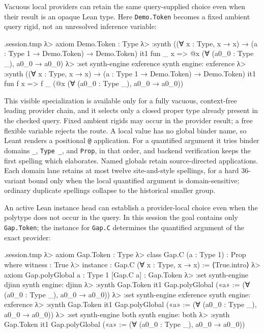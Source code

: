 \documentclass[11pt,oneside]{article}
\newcommand{\code}[1]{\texttt{#1}}
\newenvironment{session}
 {\VerbatimEnvironment\begin{VerbatimOut}{\jobname.session.tmp}}
 {\end{VerbatimOut}%
  \begin{sessionouter}%
  \VerbatimInput[fontsize=\footnotesize, breaklines=true,
    breaksymbolleft={\textcolor{stone}{\footnotesize$\hookrightarrow$}},
    formatcom=\color{ink}, tabsize=4]{\jobname.session.tmp}%
  \end{sessionouter}}
\begin{document}
Vacuous local providers can retain the same query-supplied choice even when
their result is an opaque Lean type. Here \code{Demo.Token} becomes a fixed
ambient query rigid, not an unresolved inference variable:

\begin{session}
λ> axiom Demo.Token : Type
λ> :synth ((∀ x : Type, x → x) → ({a : Type 1} → Demo.Token) → Demo.Token)
  it1  fun _ x => @x (∀ (a0_0 : Type _), a0_0 → a0_0)
λ> :set synth-engine exference
synth engine: exference
λ> :synth ((∀ x : Type, x → x) → ({a : Type 1} → Demo.Token) → Demo.Token)
  it1  fun f x => f _ (@x (∀ (a0_0 : Type _), a0_0 → a0_0))
\end{session}

This visible specialization is available only for a fully vacuous,
context-free leading provider chain, and it selects only a closed proper type
already present in the checked query. Fixed ambient rigids may occur in the
provider result; a free flexible variable rejects the route. A local value has
no global binder name, so Leant renders a positional \code{@} application. For
a quantified argument it tries binder domains \code{\_}, \code{Type \_}, and
\code{Prop}, in that order, and backend verification keeps the first spelling
which elaborates. Named globals retain source-directed applications. Each
domain lane retains at most twelve site-and-style spellings, for a hard
36-variant bound only when the local quantified argument is domain-sensitive;
ordinary duplicate spellings collapse to the historical smaller group.

An active Lean instance head can establish a provider-local choice even when
the polytype does not occur in the query. In this session the goal contains
only \code{Gap.Token}; the instance for \code{Gap.C} determines the quantified
argument of the exact provider:

\begin{session}
λ> axiom Gap.Token : Type
λ> class Gap.C (a : Type 1) : Prop where witness : True
λ> instance : Gap.C (∀ x : Type, x → x) := ⟨True.intro⟩
λ> axiom Gap.polyGlobal {a : Type 1} [Gap.C a] : Gap.Token
λ> :set synth-engine djinn
synth engine: djinn
λ> :synth Gap.Token
  it1  Gap.polyGlobal («a» := (∀ (a0_0 : Type _), a0_0 → a0_0))
λ> :set synth-engine exference
synth engine: exference
λ> :synth Gap.Token
  it1  Gap.polyGlobal («a» := (∀ (a0_0 : Type _), a0_0 → a0_0))
λ> :set synth-engine both
synth engine: both
λ> :synth Gap.Token
  it1  Gap.polyGlobal («a» := (∀ (a0_0 : Type _), a0_0 → a0_0))
\end{session}
\end{document}
